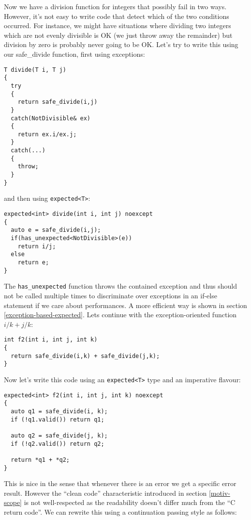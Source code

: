 \documentclass[a4paper,10pt]{article}
\newcommand{\cpp}[1]{\lstinline{#1}}
\begin{document}
Now we have a division function for integers that possibly fail in two ways. However, it's not easy to write code that detect which of the two conditions occurred. For instance, we might have situations where dividing two integers which are not evenly divisible is OK (we just throw away the remainder) but division by zero is probably never going to be OK. Let's try to write this using our safe_divide function, first using exceptions:

\begin{lstlisting}
T divide(T i, T j)
{
  try
  {
    return safe_divide(i,j)
  }
  catch(NotDivisible& ex)
  {
    return ex.i/ex.j;
  }
  catch(...)
  {
    throw;
  }
}
\end{lstlisting}

\noindent
and then using \cpp{expected<T>}:

\begin{lstlisting}
expected<int> divide(int i, int j) noexcept
{
  auto e = safe_divide(i,j);
  if(has_unexpected<NotDivisible>(e))
    return i/j;
  else 
    return e;
}
\end{lstlisting}

\noindent
The \cpp{has_unexpected} function throws the contained exception and thus should not be called multiple times to discriminate over exceptions in an if-else statement if we care about performances. A more efficient way is shown in section \ref{exception-based-expected}. Lets continue with the exception-oriented function $i/k + j/k$:

\begin{lstlisting}
int f2(int i, int j, int k)
{
  return safe_divide(i,k) + safe_divide(j,k);
}
\end{lstlisting}

\noindent
Now let's write this code using an \cpp{expected<T>} type and an imperative flavour:

\begin{lstlisting}
expected<int> f2(int i, int j, int k) noexcept
{
  auto q1 = safe_divide(i, k);
  if (!q1.valid()) return q1;

  auto q2 = safe_divide(j, k);
  if (!q2.valid()) return q2;

  return *q1 + *q2;
}
\end{lstlisting}

This is nice in the sense that whenever there is an error we get a specific error result. However the ``clean code'' characteristic introduced in section \ref{motiv-scope} is not well-respected as the readability doesn't differ much from the ``C return code''. We can rewrite this using a continuation passing style as follows:
\end{document}

